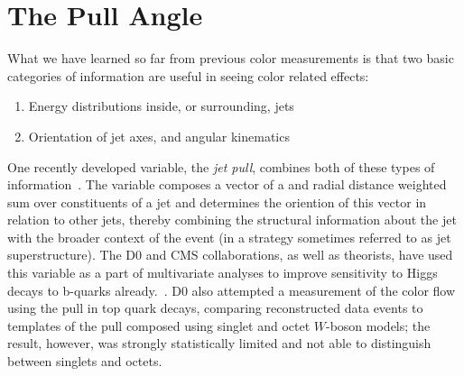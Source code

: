\section{The Pull Angle}

What we have learned so far from previous color measurements is that two basic categories of information are useful in seeing color related effects:
%
\begin{enumerate}
\item Energy distributions inside, or surrounding, jets
\item Orientation of jet axes, and angular kinematics 
\end{enumerate}
%
One recently developed variable, the \textit{jet pull}, combines both of these types of information~\cite{Gallicchio:2010sw}. The variable composes a vector of a \pt and radial distance weighted sum over constituents of a jet and determines the oriention of this vector in relation to other jets, thereby combining the structural information about the jet with the broader context of the event (in a strategy sometimes referred to as jet superstructure). The D0 and CMS collaborations, as well as theorists, have used this variable as a part of multivariate analyses to improve sensitivity to Higgs decays to b-quarks already.~\cite{D0higgs,CMShiggspap,CMShiggspap2}. D0 also attempted a measurement of the color flow using the pull in top quark decays, comparing reconstructed data events to templates of the pull composed using singlet and octet $W$-boson models; the result, however, was strongly statistically limited and not able to distinguish between singlets and octets.

